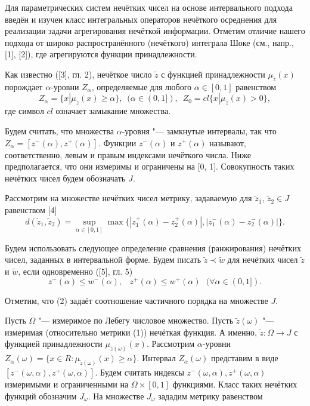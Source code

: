
\vzmscaption


Для параметрических систем нечётких чисел на основе интервального подхода введён и изучен класс интегральных операторов нечёткого осреднения для реализации задачи агрегирования нечёткой информации.  Отметим отличие нашего подхода от  широко распространённого (нечёткого) интеграла Шоке (см., напр., [1], [2]), где агрегируются функции принадлежности.

Как известно ([3], гл. 2), нечёткое число $\tilde{z}$ с функцией принадлежности $\mu_{\tilde{z}}(x)$ порождает $\alpha$-уровни $Z_{\alpha}$, определяемые для любого $\alpha\in [0, 1]$ равенством
$$
Z_{\alpha}  = \{x| \mu_{\tilde{z}}(x)\geq \alpha\},\,\,\,(\alpha\in(0, 1]),\,\,\,Z_0 = cl\{x| \mu_{\tilde{z}}(x)>0\},
$$
где символ $cl$ означает замыкание множества.

Будем считать, что  множества $\alpha$-уровня "--- замкнутые интервалы, так что $Z_{\alpha} = [z^{-}(\alpha), z^{+}(\alpha)]$. Функции $z^{-}(\alpha)$ и $z^{+}(\alpha)$ называют, соответственно, левым и правым индексами нечёткого числа. Ниже предполагается, что они измеримы и ограничены на [0, 1]. Совокупность таких нечётких чисел будем обозначать $J$.

Рассмотрим на множестве нечётких чисел метрику, задаваемую для $\tilde{z}_1$, $\tilde{z}_2\in J$ равенством [4]
\begin{equation}
d(\tilde{z}_1, \tilde{z}_2) = \sup\limits_{\alpha\in[0,1]}\max\{|z_1^{+}(\alpha) - z_2^{+}(\alpha)|, |z_1^{-}(\alpha) - z_2^{-}( \alpha)|\}.
\end{equation}

Будем использовать следующее определение сравнения (ранжирования) нечётких чисел, заданных в интервальной форме. Будем писать $\tilde{z}\prec\tilde{w}$ для нечётких чисел $\tilde{z}$ и $\tilde{w}$, если одновременно ([5], гл. 5)
\begin{equation}
z^{-}(\alpha)\leq w^{-}(\alpha), \,\,\,\,\,z^{+}(\alpha)\leq w^{+}(\alpha)\,\,\,\,(\forall\alpha\in (0,1]).
\end{equation}

Отметим, что (2) задаёт соотношение частичного порядка на множестве $J$.

Пусть $\Omega$ "--- измеримое по Лебегу числовое множество.   Пусть $\tilde{z}(\omega)$ "--- измеримая
(относительно метрики (1))  нечёткая функция. А именно, $\tilde{z}: \Omega \rightarrow J$ с функцией принадлежности $\mu_{\tilde{z}(\omega)}(x)$. Рассмотрим $\alpha$-уровни $Z_{\alpha}(\omega) = \{x\in R: \mu_{\tilde{z}(\omega)}(x)\geq \alpha\}$. Интервал $Z_{\alpha}(\omega)$ представим в виде $[z^{-}(\omega, \alpha), z^{+}(\omega, \alpha)]$. Будем считать индексы $z^{-}(\omega, \alpha), z^{+}(\omega, \alpha)$ измеримыми и ограниченными на $\Omega\times[0,1]$ функциями. Класс таких нечётких функций обозначим $J_{\omega}$. На множестве $J_{\omega}$ зададим метрику равенством


